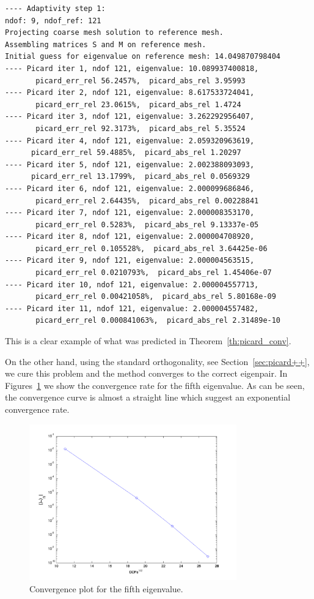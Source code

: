 \documentclass[preprint,12pt]{elsarticle}
\begin{document}
\begin{verbatim}
---- Adaptivity step 1:
ndof: 9, ndof_ref: 121
Projecting coarse mesh solution to reference mesh.
Assembling matrices S and M on reference mesh.
Initial guess for eigenvalue on reference mesh: 14.049870798404
---- Picard iter 1, ndof 121, eigenvalue: 10.089937400818, 
       picard_err_rel 56.2457%,  picard_abs_rel 3.95993
---- Picard iter 2, ndof 121, eigenvalue: 8.617533724041, 
       picard_err_rel 23.0615%,  picard_abs_rel 1.4724
---- Picard iter 3, ndof 121, eigenvalue: 3.262292956407, 
       picard_err_rel 92.3173%,  picard_abs_rel 5.35524
---- Picard iter 4, ndof 121, eigenvalue: 2.059320963619,  
      picard_err_rel 59.4885%,  picard_abs_rel 1.20297
---- Picard iter 5, ndof 121, eigenvalue: 2.002388093093, 
      picard_err_rel 13.1799%,  picard_abs_rel 0.0569329
---- Picard iter 6, ndof 121, eigenvalue: 2.000099686846, 
       picard_err_rel 2.64435%,  picard_abs_rel 0.00228841
---- Picard iter 7, ndof 121, eigenvalue: 2.000008353170, 
       picard_err_rel 0.5283%,  picard_abs_rel 9.13337e-05
---- Picard iter 8, ndof 121, eigenvalue: 2.000004708920, 
       picard_err_rel 0.105528%,  picard_abs_rel 3.64425e-06
---- Picard iter 9, ndof 121, eigenvalue: 2.000004563515, 
       picard_err_rel 0.0210793%,  picard_abs_rel 1.45406e-07
---- Picard iter 10, ndof 121, eigenvalue: 2.000004557713, 
       picard_err_rel 0.00421058%,  picard_abs_rel 5.80168e-09
---- Picard iter 11, ndof 121, eigenvalue: 2.000004557482, 
       picard_err_rel 0.000841063%,  picard_abs_rel 2.31489e-10
\end{verbatim}
This is a clear example of what was predicted in Theorem~\ref{th:picard_conv}.

On the other hand, using the standard orthogonality, see Section~\ref{sec:picard++}, we cure this problem and the method converges to the correct eigenpair. In Figures~\ref{fig:conv_eig5} we show the convergence rate for  the fifth eigenvalue. As can be seen, the convergence curve is almost a straight line which suggest an exponential convergence rate.

\begin{figure}[!ht]
\begin{center}
\includegraphics[width=0.8\textwidth]{img/ex_2.png}
\end{center}
\vspace{-5mm}
\caption{Convergence plot for the fifth eigenvalue.}
\label{fig:conv_eig5}
\end{figure}
\end{document}
